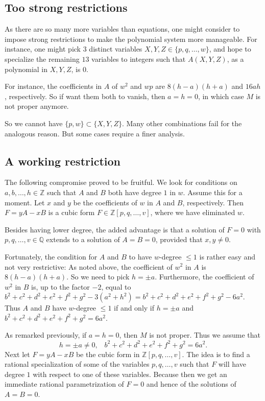 \documentclass[12pt]{amsart}
\theoremstyle{definition}
\newcommand{\QQ}{\mathbb Q}
\newcommand{\ZZ}{\mathbb Z}
\newcommand*{\set}[1]{\{#1\}}
\begin{document}
\subsection{Too strong restrictions}
As there are so many more variables than equations, one might consider
to impose strong restrictions to make the polynomial system more
manageable. For instance, one might pick $3$ distinct variables
$X,Y,Z\in\set{p,q,\dots,w}$, and hope to specialize the remaining
$13$ variables to integers such that $A(X, Y, Z)$, as a polynomial in
$X, Y, Z$, is $0$.

For instance, the coefficients in $A$ of $w^2$ and $wp$ are
$8(h-a)(h+a)$ and $16ah$, respectively. So if want them both to
vanish, then $a=h=0$, in which case $M$ is not proper anymore.

So we cannot have $\set{p, w}\subset\set{X,Y,Z}$. Many other combinations
fail for the analogous reason. But some cases require a finer
analysis.
\subsection{A working restriction}
The following compromise proved to be fruitful. We look for conditions
on $a,b,\dots,h\in\ZZ$ such that $A$ and $B$ both have degree $1$ in
$w$. Assume this for a moment. Let $x$ and $y$ be the coefficients of
$w$ in $A$ and $B$, respectively. Then $F=yA-xB$ is a cubic form
$F\in\ZZ[p,q,\dots,v]$, where we have eliminated $w$.

Besides having lower degree, the added advantage is that a solution of
$F=0$ with $p,q,\dots,v\in\QQ$ extends to a solution of $A=B=0$,
provided that $x,y\ne0$.

Fortunately, the condition for $A$ and $B$ to have $w$-degree $\le1$ is
rather easy and not very restrictive: As noted above, the coefficient
of $w^2$ in $A$ is $8(h-a)(h+a)$. So we need to pick $h=\pm
a$. Furthermore, the coefficient of $w^2$ in $B$ is, up to the factor
$-2$, equal to
$b^2 + c^2 + d^2 + e^2 + f^2 + g^2-3(a^2+h^2)=b^2 + c^2 + d^2 + e^2 +
f^2 + g^2-6a^2$. Thus $A$ and $B$ have $w$-degree $\le1$ if and only
if $h=\pm a$ and $b^2 + c^2 + d^2 + e^2 + f^2 + g^2 = 6a^2$.

As remarked previously, if $a=h=0$, then $M$ is not proper. Thus we
assume that
\begin{equation}\label{eq:w1}
  h = \pm a\ne0,\;\;\; b^2 + c^2 + d^2 + e^2 + f^2 + g^2 = 6a^2.
\end{equation}
Next let $F=yA-xB$ be the cubic form in $\ZZ[p,q,\dots,v]$. The idea
is to find a rational specialization of some of the variables
$p,q,\dots,v$ such that $F$ will have degree $1$ with respect to one
of these variables. Because then we get an immediate rational
parametrization of $F=0$ and hence of the solutions of $A=B=0$.
\end{document}
